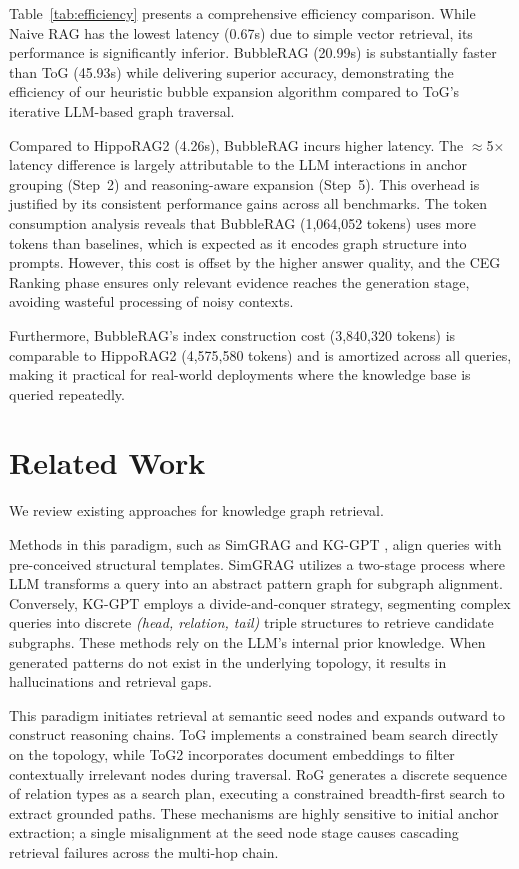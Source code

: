 Table~\ref{tab:efficiency} presents a comprehensive efficiency comparison. While Naive RAG has the lowest latency (0.67s) due to simple vector retrieval, its performance is significantly inferior. BubbleRAG (20.99s) is substantially faster than ToG (45.93s) while delivering superior accuracy, demonstrating the efficiency of our heuristic bubble expansion algorithm compared to ToG's iterative LLM-based graph traversal.

Compared to HippoRAG2 (4.26s), BubbleRAG incurs higher latency. The $\approx$5$\times$ latency difference is largely attributable to the LLM interactions in anchor grouping (Step~2) and reasoning-aware expansion (Step~5). This overhead is justified by its consistent performance gains across all benchmarks. The token consumption analysis reveals that BubbleRAG (1,064,052 tokens) uses more tokens than baselines, which is expected as it encodes graph structure into prompts. However, this cost is offset by the higher answer quality, and the CEG Ranking phase ensures only relevant evidence reaches the generation stage, avoiding wasteful processing of noisy contexts.

Furthermore, BubbleRAG's index construction cost (3,840,320 tokens) is comparable to HippoRAG2 (4,575,580 tokens) and is amortized across all queries, making it practical for real-world deployments where the knowledge base is queried repeatedly.

\section{Related Work}

We review existing approaches for knowledge graph retrieval.

Methods in this paradigm, such as SimGRAG \cite{2025-simgrag} and KG-GPT \cite{2023-kggpt}, align queries with pre-conceived structural templates. SimGRAG utilizes a two-stage process where LLM transforms a query into an abstract pattern graph for subgraph alignment. Conversely, KG-GPT employs a divide-and-conquer strategy, segmenting complex queries into discrete \textit{(head, relation, tail)} triple structures to retrieve candidate subgraphs. These methods rely on the LLM's internal prior knowledge. When generated patterns do not exist in the underlying topology, it results in hallucinations and retrieval gaps.

This paradigm initiates retrieval at semantic seed nodes and expands outward to construct reasoning chains. ToG \cite{2024-thinkongraph} implements a constrained beam search directly on the topology, while ToG2 \cite{2025-thinkongraph2} incorporates document embeddings to filter contextually irrelevant nodes during traversal. RoG \cite{2024-reasoninggraphs} generates a discrete sequence of relation types as a search plan, executing a constrained breadth-first search to extract grounded paths. These mechanisms are highly sensitive to initial anchor extraction; a single misalignment at the seed node stage causes cascading retrieval failures across the multi-hop chain.

